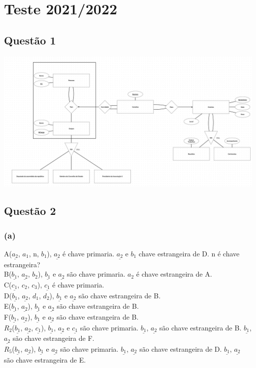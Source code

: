 \documentclass{article}
\begin{document}
\section*{Teste 2021/2022}

\subsection*{Questão 1}

\includegraphics*[width=\textwidth]{der-21-22.png}

\subsection*{Questão 2}
\subsubsection*{(a)}
A($\underline{a_2}$, $a_1$, n, $b_1$), $\underline{a_2}$ é chave primaria. $\underline{a_2}$ e $b_1$ chave estrangeira de D. n é chave estrangeira?\\
B($\underline{b_1}$, $\underline{a_2}$, $b_2$), $\underline{b_1}$ e $\underline{a_2}$ são  chave primaria. $a_2$ é chave estrangeira de A. \\
C($\underline{c_1}$, $c_2$, $c_3$), $\underline{c_1}$ é chave primaria. \\
D($\underline{b_1}$, $\underline{a_2}$, $d_1$, $d_2$), $\underline{b_1}$ e $\underline{a_2}$ são chave estrangeira de B. \\
E($\underline{b_1}$, $\underline{a_2}$), $\underline{b_1}$ e $\underline{a_2}$ são chave estrangeira de B. \\
F($\underline{b_1}$, $\underline{a_2}$), $\underline{b_1}$ e $\underline{a_2}$ são chave estrangeira de B. \\
$R_2$($\underline{b_1}$, $\underline{a_2}$, $\underline{c_1}$), $\underline{b_1}$, $\underline{a_2}$ e $\underline{c_1}$ são chave primaria. $\underline{b_1}$, $\underline{a_2}$ são chave estrangeira de B. $\underline{b_1}$, $\underline{a_2}$ são chave estrangeira de F. \\
$R_5$($\underline{b_1}$, $\underline{a_2}$), $\underline{b_1}$ e $\underline{a_2}$ são chave primaria. $\underline{b_1}$, $\underline{a_2}$ são chave estrangeira de D. $\underline{b_1}$, $\underline{a_2}$ são chave estrangeira de E.
\end{document}
